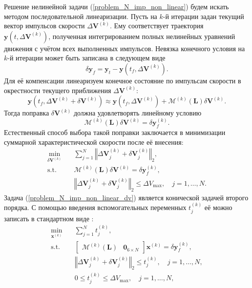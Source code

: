 Решение нелинейной задачи (\ref{problem_N_imp_non_linear}) будем искать методом последовательной линеаризации. Пусть на $k$-й итерации задан текущий вектор импульсов скорости $\Delta \mathbf{V}^{(k)}$. Ему соответствует траектория $\mathbf{y}(t, \Delta \mathbf{V}^{(k)})$, полученная интегрированием полных нелинейных уравнений движения с учётом всех выполненных импульсов. Невязка конечного условия на $k$-й итерации может быть записана в следующем виде
\begin{equation}
    \delta \mathbf{y}_f = \mathbf{y}_t - \mathbf{y}(t_f, \Delta \mathbf{V}^{(k)}).
\end{equation} 
Для её компенсации линеаризуем конечное состояние по импульсам скорости в окрестности текущего приближения $\Delta \mathbf{V}^{(k)}$:
\begin{equation}
    \mathbf{y}(t_f, \Delta \mathbf{V}^{(k)} + \delta \mathbf{V}^{(k)}) \approx  \mathbf{y}(t_f, \Delta \mathbf{V}^{(k)}) + \mathcal{M}^{(k)} (\mathbf{L}) \delta \mathbf{V}^{(k)}.
\end{equation}
Тогда поправка $\delta \mathbf{V}^{(k)}$ должна удовлетворять линейному условию
\begin{equation}
    \mathcal{M}^{(k)} (\mathbf{L}) \delta \mathbf{V}^{(k)} = \delta \mathbf{y}_f^{(k)}.
\label{M_k_dv_k_dy_k}
\end{equation}
Естественный способ выбора такой поправки заключается в минимизации суммарной характеристической скорости после её внесения:
\begin{equation}
\begin{aligned}
    \min_{\delta \mathbf{V}^{(k)}} \quad &\sum_{j=1}^N \left\Vert \Delta \mathbf{V}_j^{(k)} + \delta \mathbf{V}_j^{(k)} \right\Vert_2, \\
    \text{s.t.} \quad &\mathcal{M}^{(k)} (\mathbf{L}) \delta \mathbf{V}^{(k)} = \delta \mathbf{y}_f^{(k)}, \\
    &\left\Vert \Delta \mathbf{V}_j^{(k)} + \delta \mathbf{V}_j^{(k)} \right\Vert_2 \leq \Delta V_{\text{max}}, \quad j = 1, \dots, N.
\end{aligned}
\label{problem_N_imp_non_linear_dv}
\end{equation}
Задача (\ref{problem_N_imp_non_linear_dv}) является конической задачей второго порядка. С помощью введения вспомогательных переменных $t^{(k)}_j$ её можно записать в стандартном виде \cite{lobo1998applications}:
\begin{equation}
\begin{aligned}
    \min_{\mathbf{x}^{(k)}} \quad &\sum_{j=1}^N t^{(k)}_j, \\
    \text{s.t.} \quad 
    &\begin{bmatrix} 
        \mathcal{M}^{(k)} (\mathbf{L}) & \mathbf{0}_{6 \times N}
    \end{bmatrix} \mathbf{x}^{(k)} = \delta \mathbf{y}_f^{(k)}, \\
    &\left\Vert \Delta \mathbf{V}_j^{(k)} + \delta \mathbf{V}_j^{(k)} \right\Vert_2 \leq t^{(k)}_j, \quad j = 1, \dots, N, \\
    &0 \leq t^{(k)}_j \leq \Delta V_{\text{max}}, \quad j = 1, \dots, N,
\end{aligned}
\label{problem_N_imp_non_linear_dv_SOCP}
\end{equation}
